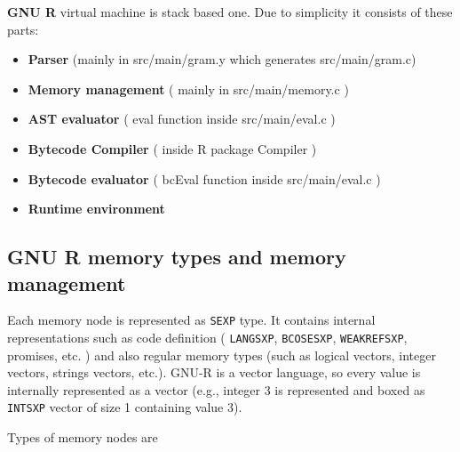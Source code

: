 \documentclass[thesis=M,english]{FITthesis}[2018/10/20]
\newcommand{\code}[1]{\texttt{#1}}
\begin{document}
\textbf{GNU R} virtual machine is stack based one. Due to simplicity it consists of these parts:
\begin{itemize}
	\item \textbf{Parser} (mainly in src/main/gram.y which generates src/main/gram.c)
	\item \textbf{Memory management} ( mainly in src/main/memory.c )
	\item \textbf{AST evaluator} ( eval function inside src/main/eval.c )
	\item \textbf{Bytecode Compiler} ( inside R package Compiler )
	\item \textbf{Bytecode evaluator} ( bcEval function inside src/main/eval.c )
	\item \textbf{Runtime environment}
\end{itemize}

\subsection{GNU R memory types and memory management}\label{memory-management}

Each memory node is represented as \code{SEXP} type. It contains internal representations such as code definition ( \code{LANGSXP}, \code{BCOSESXP}, \code{WEAKREFSXP}, promises, etc. ) and also regular memory types (such as logical vectors, integer vectors, strings vectors, etc.). GNU-R is a vector language, so every value is internally represented as a vector (e.g., integer 3 is represented and boxed as \code{INTSXP} vector of size 1 containing value 3).

Types of memory nodes are
\end{document}
